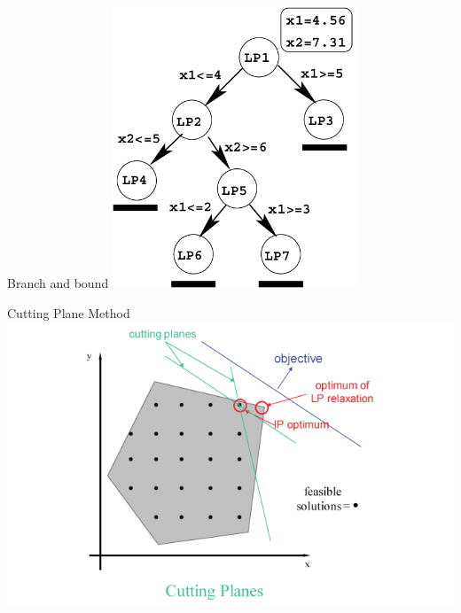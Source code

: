     \begin{frame}{Branch and bound}
      \centering
      \includegraphics[width = 0.55\textwidth]{images/Branch.png}
    \end{frame}

    \begin{frame}{Cutting Plane Method}
      \centering
      \includegraphics[width = 1\textwidth]{images/CP.png}
    \end{frame}


